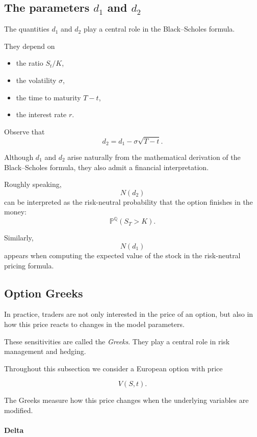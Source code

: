 \documentclass[11pt]{article}
\newcommand{\Pbb}{\mathbb{P}}
\newcommand{\Qbb}{\mathbb{Q}}
\newcommand{\1}{\mathbf{1}}
\theoremstyle{plain}
\theoremstyle{definition}
\theoremstyle{remark}
\begin{document}
\subsection{The parameters \(d_1\) and \(d_2\)}

The quantities \(d_1\) and \(d_2\) play a central role in the
Black--Scholes formula.

They depend on
\begin{itemize}[leftmargin=1.4em]
    \item the ratio \(S_t/K\),
    \item the volatility \(\sigma\),
    \item the time to maturity \(T-t\),
    \item the interest rate \(r\).
\end{itemize}

Observe that
\[
d_2 = d_1 - \sigma\sqrt{T-t}.
\]

Although \(d_1\) and \(d_2\) arise naturally from the mathematical
derivation of the Black--Scholes formula, they also admit a financial
interpretation.

Roughly speaking,
\[
N(d_2)
\]
can be interpreted as the risk-neutral probability that the option
finishes in the money:
\[
\Pbb^{\Qbb}(S_T>K).
\]

Similarly,
\[
N(d_1)
\]
appears when computing the expected value of the stock in the
risk-neutral pricing formula.

\subsection{Option Greeks}

In practice, traders are not only interested in the price of an option,
but also in how this price reacts to changes in the model parameters.

These sensitivities are called the \emph{Greeks}.  
They play a central role in risk management and hedging.

Throughout this subsection we consider a European option with price

\[
V(S,t).
\]

The Greeks measure how this price changes when the underlying variables
are modified.

\paragraph{Delta}
\end{document}
